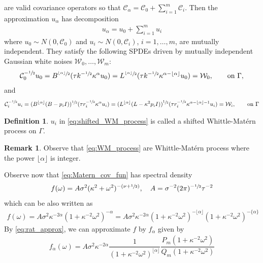 \documentclass[11pt,a4paper]{article}
\theoremstyle{plain}
\theoremstyle{definition}
\newtheorem{definition}[theorem]{Definition}
\newtheorem{remark}{Remark}
\begin{document}
 are valid covariance operators so that $\mathcal{C}_\alpha = \mathcal{C}_0+\sum_{i=1}^m\mathcal{C}_i$. Then the approximation $u_\alpha$ has decomposition
\begin{align}
    u_\alpha = u_0+\sum_{i=1}^mu_i
\end{align}
where $u_0\sim N(0,\mathcal{C}_0)$ and $u_i\sim N(0,\mathcal{C}_i)$, $i=1,\ldots,m$, are mutually independent. They satisfy the following SPDEs driven by mutually independent Gaussian white noises $\mathcal{W}_0,\ldots,\mathcal{W}_m$:
\begin{align}
\label{eq:WM_process}
   \mathcal{C}_0^{-\sfrac{1}{2}}u_0= B^{\sfrac{\lfloor\alpha\rfloor}{2}}(\tau k^{-\sfrac{1}{2}}\kappa^{\alpha}u_0) = L^{\sfrac{\lfloor\alpha\rfloor}{2}}(\tau k^{-\sfrac{1}{2}}\kappa^{\alpha-\lfloor\alpha\rfloor}u_0) = \mathcal{W}_0, \qquad \text{on $\Gamma$},
\end{align}
and
\begin{align}
\label{eq:shifted_WM_process}
   \mathcal{C}_i^{-\sfrac{1}{2}}u_i =  (B^{\lfloor\alpha\rfloor}(B-p_iI))^{\sfrac{1}{2}}(\tau r_i^{-\sfrac{1}{2}}\kappa^{\alpha}u_i) = (L^{\lfloor\alpha\rfloor}(L-\kappa^2p_iI))^{\sfrac{1}{2}}(\tau r_i^{-\sfrac{1}{2}}\kappa^{\alpha-\lfloor\alpha\rfloor-1}u_i) = \mathcal{W}_i, \qquad \text{on $\Gamma$}
\end{align}
\begin{definition}
    $u_i$ in \eqref{eq:shifted_WM_process} is called a shifted Whittle-Matérn process on $\Gamma$.
\end{definition}
\begin{remark}
    Observe that \eqref{eq:WM_process} are Whittle-Matérn process where the power $\lfloor\alpha\rfloor$ is integer.
\end{remark}
Observe now that \eqref{eq:Matern_cov_fun} has spectral density 
\begin{align}
f(\omega) = A\sigma^2(\kappa^2+\omega^2)^{-(\nu+\sfrac{1}{2})},\quad A = \sigma^{-2}(2\pi)^{-\sfrac{1}{2}}\tau^{-2}
\end{align}
which can be also written as 
\begin{align}
    f(\omega) = A\sigma^2\kappa^{-2\alpha}(1+\kappa^{-2}\omega^2)^{-\alpha} = A\sigma^2\kappa^{-2\alpha}(1+\kappa^{-2}\omega^2)^{-\lfloor\alpha\rfloor} (1+\kappa^{-2}\omega^2)^{-\{\alpha\}}
\end{align}
By \eqref{eq:rat_approx}, we can approximate $f$ by $f_\alpha$ given by
\begin{align}
    f_\alpha(\omega) = A\sigma^2\kappa^{-2\alpha}\dfrac{1}{(1+\kappa^{-2}\omega^2)^{\lfloor\alpha\rfloor} }\dfrac{P_m(1+\kappa^{-2}\omega^2)}{Q_m(1+\kappa^{-2}\omega^2)}
\end{align}
\end{document}
